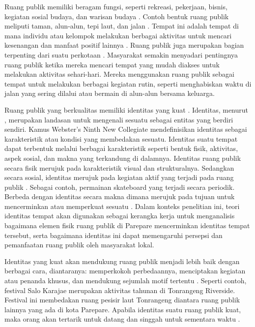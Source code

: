 \documentclass[11pt]{simart} %
\begin{document}
Ruang publik memiliki beragam fungsi, seperti rekreasi, pekerjaan, bisnis, kegiatan sosial budaya, dan warisan budaya \citep{hajmirsadeghi2012}. Contoh bentuk ruang publik meliputi taman, alun-alun, tepi laut, dan jalan \citep{hajmirsadeghi2012}. Tempat ini adalah tempat di mana individu atau kelompok melakukan berbagai aktivitas untuk mencari kesenangan dan manfaat positif lainnya \citep{hajmirsadeghi2012}.
Ruang publik juga merupakan bagian terpenting dari suatu perkotaan \citep{dong2004}. Masyarakat semakin menyadari pentingnya ruang publik ketika mereka mencari tempat yang mudah diakses untuk melakukan aktivitas sehari-hari. Mereka menggunakan ruang publik sebagai tempat untuk melakukan berbagai kegiatan rutin, seperti menghabiskan waktu di jalan yang sering dilalui atau bermain di alun-alun bersama keluarga.

Ruang publik yang berkualitas memiliki identitas yang kuat \citep{hartanti2014}. Identitas, menurut \cite{hartanti2014}, merupakan landasan untuk mengenali sesuatu sebagai entitas yang berdiri sendiri. Kamus Webster’s Ninth New Collegiate mendefinisikan identitas sebagai karakteristik atau kondisi yang membedakan sesuatu. Identitas suatu tempat dapat terbentuk melalui berbagai karakteristik seperti bentuk fisik, aktivitas, aspek sosial, dan makna yang terkandung di dalamnya.
Identitas ruang publik secara fisik merujuk pada karakteristik visual dan strukturalnya.
Sedangkan secara sosial, identitas merujuk pada kegiatan aktif yang terjadi pada ruang publik \citep{al2023}. Sebagai contoh, permainan skateboard yang terjadi secara periodik. Berbeda dengan identitas secara makna dimana merujuk pada tujuan untuk mencerminkan atau memperkuat sesuatu \citep{sari2024}.
Dalam konteks penelitian ini, teori identitas tempat akan digunakan sebagai kerangka kerja untuk menganalisis bagaimana elemen fisik ruang publik di Parepare mencerminkan identitas tempat tersebut, serta bagaimana identitas ini dapat memengaruhi persepsi dan pemanfaatan ruang publik oleh masyarakat lokal.

Identitas yang kuat akan mendukung ruang publik menjadi lebih baik dengan berbagai cara, diantaranya: memperkokoh perbedaannya, menciptakan kegiatan atau penanda khusus, dan mendukung sejumlah motif tertentu \citep{hartanti2014}. Seperti contoh, festival Salo Karajae merupakan aktivitas tahunan di Tonrangeng Riverside. Festival ini membedakan ruang pesisir laut Tonrangeng diantara ruang publik lainnya yang ada di kota Parepare. Apabila identitas suatu ruang publik kuat, maka orang akan tertarik untuk datang dan singgah untuk sementara waktu \citep{oktay2002}.
\end{document}

